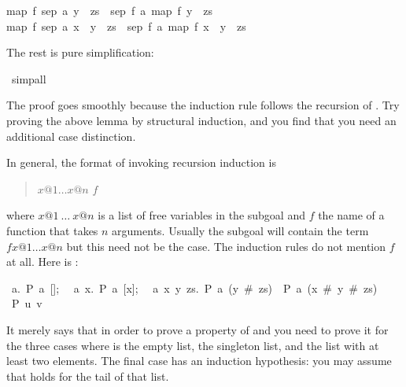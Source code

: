\begin{isabellebody}
\begin{isamarkuptxt}
\begin{isabelle}
map\ f\ {\isacharparenleft}sep\ a\ {\isacharparenleft}y\ {\isacharhash}\ zs{\isacharparenright}{\isacharparenright}\ {\isacharequal}\ sep\ {\isacharparenleft}f\ a{\isacharparenright}\ {\isacharparenleft}map\ f\ {\isacharparenleft}y\ {\isacharhash}\ zs{\isacharparenright}{\isacharparenright}\ {\isasymLongrightarrow}\isanewline
{}map\ f\ {\isacharparenleft}sep\ a\ {\isacharparenleft}x\ {\isacharhash}\ y\ {\isacharhash}\ zs{\isacharparenright}{\isacharparenright}\ {\isacharequal}\ sep\ {\isacharparenleft}f\ a{\isacharparenright}\ {\isacharparenleft}map\ f\ {\isacharparenleft}x\ {\isacharhash}\ y\ {\isacharhash}\ zs{\isacharparenright}{\isacharparenright}%
\end{isabelle}
The rest is pure simplification:%
\end{isamarkuptxt}%
\isamarkuptrue%
\isamarkupfalse%
\ simp{\isacharunderscore}all\isanewline
{}\isamarkupfalse%
%
\endisatagproof
{\isafoldproof}%
%
\isadelimproof
%
\endisadelimproof
%
\begin{isamarkuptext}%
\noindent The proof goes smoothly because the induction rule
follows the recursion of .  Try proving the above lemma by
structural induction, and you find that you need an additional case
distinction.

In general, the format of invoking recursion induction is
\begin{quote}
 $x@1 \dots x@n$  $f$
\end{quote}%
where $x@1~\dots~x@n$ is a list of free variables in the subgoal and $f$ the
name of a function that takes $n$ arguments. Usually the subgoal will
contain the term $f x@1 \dots x@n$ but this need not be the case. The
induction rules do not mention $f$ at all. Here is :
\begin{isabelle}
{\isasymlbrakk}~{\isasymAnd}a.~P~a~[];\isanewline
~~{\isasymAnd}a~x.~P~a~[x];\isanewline
~~{\isasymAnd}a~x~y~zs.~P~a~(y~\#~zs)~{\isasymLongrightarrow}~P~a~(x~\#~y~\#~zs){\isasymrbrakk}\isanewline
{\isasymLongrightarrow}~P~u~v%
\end{isabelle}
It merely says that in order to prove a property  of  and
 you need to prove it for the three cases where  is the
empty list, the singleton list, and the list with at least two elements.
The final case has an induction hypothesis:  you may assume that 
holds for the tail of that list.
%
\end{isamarkuptext}%
\isamarkuptrue%
%
\isadelimtheory
%
\endisadelimtheory
%
\isatagtheory
%
\endisatagtheory
{\isafoldtheory}%
%
\isadelimtheory
%
\endisadelimtheory
\end{isabellebody}%
